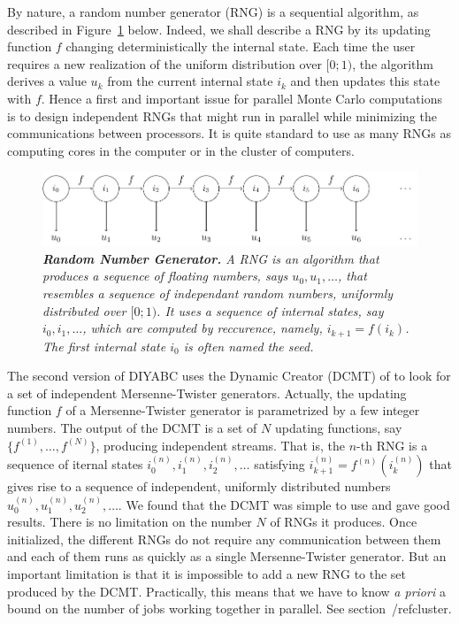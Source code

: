 By nature, a random number generator (RNG) is a sequential algorithm,
as described in Figure~\ref{fig:rng1} below. Indeed, we shall describe a RNG
by its updating function $f$ changing deterministically the internal
state.  Each time the user requires a new realization of the uniform
distribution over $[0;1)$, the algorithm derives a value $u_k$ from
the current internal state $i_k$ and then updates this state with $f$.
Hence a first and important issue for parallel Monte Carlo
computations is to design independent RNGs that might run in parallel
while minimizing the communications between processors. It is quite
standard to use as many RNGs as computing cores in the computer or in
the cluster of computers. 


\begin{figure}[htb]
\centering \it
\begin{minipage}[c]{.6\linewidth}
  \includegraphics[width=\textwidth]{DCMT_rng.pdf}
  \caption[width=.6\textwidth]{\label{fig:rng1} \it\footnotesize
    \textbf{Random Number Generator.} A RNG is an algorithm
    that produces a sequence
    of floating numbers, says $u_0, u_1, \ldots$, that resembles a
    sequence of independant random numbers, uniformly distributed over
    $[0;1)$.
    It uses a sequence of
    internal states, say $i_0, i_1,\ldots$, which are computed by
    reccurence, namely, $i_{k+1}=f(i_k)$. The first internal state
    $i_0$ is often named the seed.}
\end{minipage}
\end{figure}

The second
version of DIYABC uses the Dynamic Creator (DCMT) of
\citet{DCMT} to look for a set of independent
Mersenne-Twister generators. Actually, the updating function $f$ of a
Mersenne-Twister generator is parametrized by a few integer
numbers. 
The output of the DCMT is a set of $N$ updating functions,
say $\{f^{(1)}, \ldots, f^{(N)}\}$, producing independent streams. 
That is, the $n$-th RNG is a sequence of iternal states
$i_0^{(n)},i_1^{(n)}, i_2^{(n)}, \ldots$ satisfying
$i_{k+1}^{(n)}=f^{(n)}(i_k^{(n)})$
that gives rise to a sequence of independent, uniformly distributed numbers
$u_0^{(n)}, u_1^{(n)}, u_2^{(n)},\ldots$.
We found that the DCMT was simple to use and gave good results.  There
is no limitation on the number $N$ of RNGs it produces. Once initialized,
the different RNGs do not require any communication between them and
each of them runs as quickly as a single Mersenne-Twister
generator. But an important limitation is that it is impossible to add a
new RNG to the set produced by the DCMT. Practically, this means that
we have to know \textit{a priori} a bound on the number of
jobs working together in parallel. See section~/ref{cluster}.





